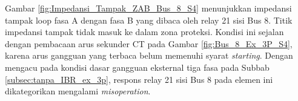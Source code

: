 Gambar \ref{fig:Impedansi_Tampak_ZAB_Bus_8_S4} menunjukkan impedansi tampak loop fasa A dengan fasa B yang dibaca oleh relay 21 sisi Bus 8. Titik impedansi tampak tidak masuk ke dalam zona proteksi. Kondisi ini sejalan dengan pembacaan arus sekunder CT pada Gambar \ref{fig:Bus_8_Ex_3P_S4}, karena arus gangguan yang terbaca belum memenuhi syarat \textit{starting}. Dengan mengacu pada kondisi dasar gangguan eksternal tiga fasa pada Subbab \ref{subsec:tanpa_IBR_ex_3p}, respons relay 21 sisi Bus 8 pada elemen ini dikategorikan mengalami \textit{misoperation}.







